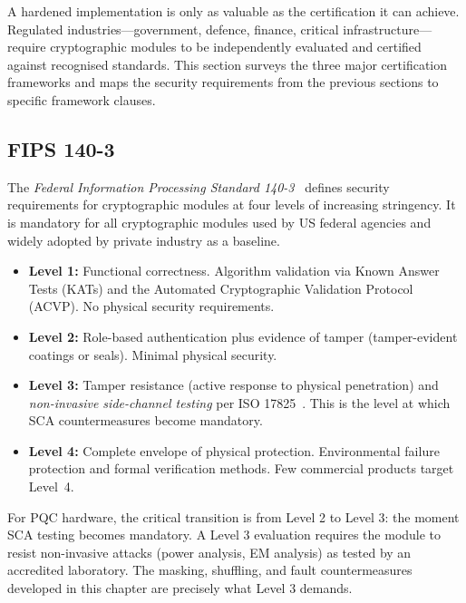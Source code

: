 A hardened implementation is only as valuable as the certification it can achieve.  Regulated industries---government, defence, finance, critical infrastructure---require cryptographic modules to be independently evaluated and certified against recognised standards.  This section surveys the three major certification frameworks and maps the security requirements from the previous sections to specific framework clauses.

\subsection{FIPS 140-3}
\label{subsec:fips140}

The \emph{Federal Information Processing Standard 140-3}~\cite{FIPS140-3} defines security requirements for cryptographic modules at four levels of increasing stringency.  It is mandatory for all cryptographic modules used by US federal agencies and widely adopted by private industry as a baseline.

\begin{definition}
\label{def:fips-levels}
\begin{itemize}
\item \textbf{Level 1:} Functional correctness.  Algorithm validation via Known Answer Tests (KATs) and the Automated Cryptographic Validation Protocol (ACVP).  No physical security requirements.
\item \textbf{Level 2:} Role-based authentication plus evidence of tamper (tamper-evident coatings or seals).  Minimal physical security.
\item \textbf{Level 3:} Tamper resistance (active response to physical penetration) and \emph{non-invasive side-channel testing} per ISO 17825~\cite{ISO17825}.  This is the level at which SCA countermeasures become mandatory.
\item \textbf{Level 4:} Complete envelope of physical protection.  Environmental failure protection and formal verification methods.  Few commercial products target Level~4.
\end{itemize}
\end{definition}

For PQC hardware, the critical transition is from Level 2 to Level 3: the moment SCA testing becomes mandatory.  A Level 3 evaluation requires the module to resist non-invasive attacks (power analysis, EM analysis) as tested by an accredited laboratory.  The masking, shuffling, and fault countermeasures developed in this chapter are precisely what Level 3 demands.


